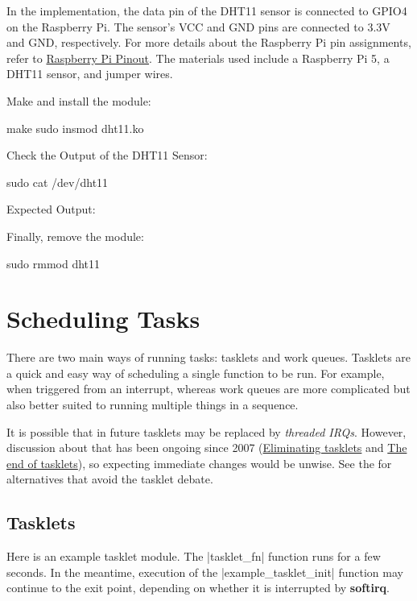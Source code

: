 \documentclass[10pt, oneside]{book}
\begin{document}
In the implementation, the data pin of the DHT11 sensor is connected to GPIO4 on the Raspberry Pi.
The sensor's VCC and GND pins are connected to 3.3V and GND, respectively.
For more details about the Raspberry Pi pin assignments, refer to \href{https://pinout.xyz/}{Raspberry Pi Pinout}.
The materials used include a Raspberry Pi 5, a DHT11 sensor, and jumper wires.

Make and install the module:
\begin{codebash}
make
sudo insmod dht11.ko
\end{codebash}

Check the Output of the DHT11 Sensor:
\begin{codebash}
sudo cat /dev/dht11
\end{codebash}

Expected Output:

Finally, remove the module:
\begin{codebash}
sudo rmmod dht11
\end{codebash}

\section{Scheduling Tasks}
\label{sec:scheduling_tasks}
There are two main ways of running tasks: tasklets and work queues.
Tasklets are a quick and easy way of scheduling a single function to be run.
For example, when triggered from an interrupt,
whereas work queues are more complicated but also better suited to running multiple things in a sequence.

It is possible that in future tasklets may be replaced by \textit{threaded IRQs}.
However, discussion about that has been ongoing since 2007 (\href{https://lwn.net/Articles/239633}{Eliminating tasklets} and \href{https://lwn.net/Articles/960041/}{The end of tasklets}),
so expecting immediate changes would be unwise.
See the  for alternatives that avoid the tasklet debate.

\subsection{Tasklets}
\label{sec:tasklet}
Here is an example tasklet module.
The \cpp|tasklet_fn| function runs for a few seconds.
In the meantime, execution of the \cpp|example_tasklet_init| function may continue to the exit point,
depending on whether it is interrupted by \textbf{softirq}.
\end{document}
